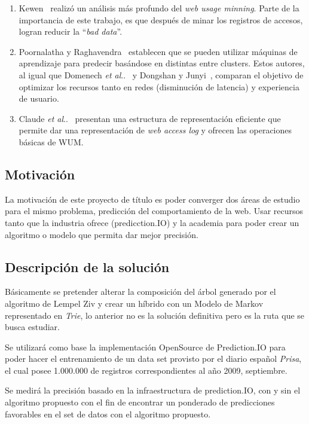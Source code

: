 \documentclass{udparticle}
\makeatletter
\DeclareRobustCommand\onedot{\futurelet\@let@token\@onedot}
\newcommand\@onedot{\ifx\@let@token.\else.\null\fi\xspace}
\newcommand\etal{\emph{et al}\onedot}
\makeatother
\begin{document}
\begin{enumerate}
  \item Kewen~\cite{kewen2012} realizó un análisis más profundo del \emph{web usage minning}.
  Parte de la importancia de este trabajo, es que después de minar los registros de accesos, logran reducir la ``\emph{bad data}''.

  \item Poornalatha y Raghavendra~\cite{Poornalatha2012} establecen que se pueden utilizar máquinas de aprendizaje para predecir basándose en distintas entre clusters. Estos autores, al igual que Domenech \etal~\cite{Domenech2006} y Dongshan y Junyi~\cite{Dongshan2002}, comparan el objetivo de optimizar los recursos tanto en redes (disminución de latencia) y experiencia de usuario.

  \item Claude \etal~\cite{Claude2014} presentan una estructura de representación eficiente que permite dar una representación de \emph{web access log} y ofrecen las operaciones básicas de WUM.
\end{enumerate}


\subsection{Motivación}

La motivación de este proyecto de título es poder converger dos áreas de estudio para el mismo problema, predicción del comportamiento de la web. Usar recursos tanto que la industria ofrece (predicction.IO) y la academia para poder crear un algoritmo o modelo que permita dar mejor precisión.


\subsection{Descripción de la solución }

Básicamente se pretender alterar la composición del árbol generado por el algoritmo de Lempel Ziv y crear un híbrido con un Modelo de Markov representado en \emph{Trie}, lo anterior no es la solución definitiva pero es la ruta que se busca estudiar.

Se utilizará como base la implementación OpenSource de Prediction.IO para poder hacer el entrenamiento de un data set provisto por el diario español \emph{Prisa}, el cual posee 1.000.000 de registros correspondientes al año 2009, septiembre.

Se medirá la precisión basado en la infraestructura de prediction.IO, con  y sin el algoritmo propuesto con el fin de encontrar un ponderado de predicciones favorables en el set de datos con el algoritmo propuesto.
\end{document}
